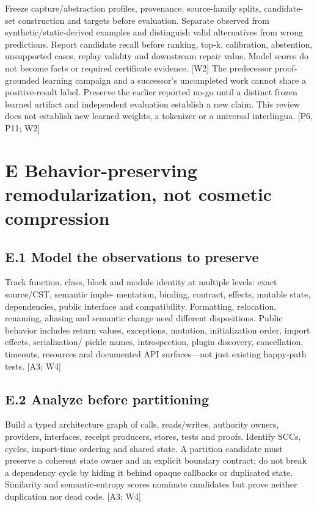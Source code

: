 Freeze capture/abstraction profiles, provenance, source-family splits, candidate-set construction and
targets before evaluation. Separate observed from synthetic/static-derived examples and distinguish
valid alternatives from wrong predictions. Report candidate recall before ranking, top-k, calibration,
abstention, unsupported cases, replay validity and downstream repair value. Model scores do not
become facts or required certificate evidence. [W2]
The predecessor proof-grounded learning campaign and a successor’s uncompleted work cannot share
a positive-result label. Preserve the earlier reported no-go until a distinct frozen learned artifact and
independent evaluation establish a new claim. This review does not establish new learned weights, a
tokenizer or a universal interlingua. [P6, P11; W2]


\section*{E Behavior-preserving remodularization, not cosmetic compression}
\subsection*{E.1 Model the observations to preserve}

Track function, class, block and module identity at multiple levels: exact source/CST, semantic imple-
mentation, binding, contract, effects, mutable state, dependencies, public interface and compatibility.
Formatting, relocation, renaming, aliasing and semantic change need different dispositions. Public
behavior includes return values, exceptions, mutation, initialization order, import effects, serialization/
pickle names, introspection, plugin discovery, cancellation, timeouts, resources and documented API
surfaces—not just existing happy-path tests. [A3; W4]

\subsection*{E.2 Analyze before partitioning}

Build a typed architecture graph of calls, reads/writes, authority owners, providers, interfaces, receipt
producers, stores, tests and proofs. Identify SCCs, cycles, import-time ordering and shared state. A
partition candidate must preserve a coherent state owner and an explicit boundary contract; do not
break a dependency cycle by hiding it behind opaque callbacks or duplicated state. Similarity and
semantic-entropy scores nominate candidates but prove neither duplication nor dead code. [A3; W4]

